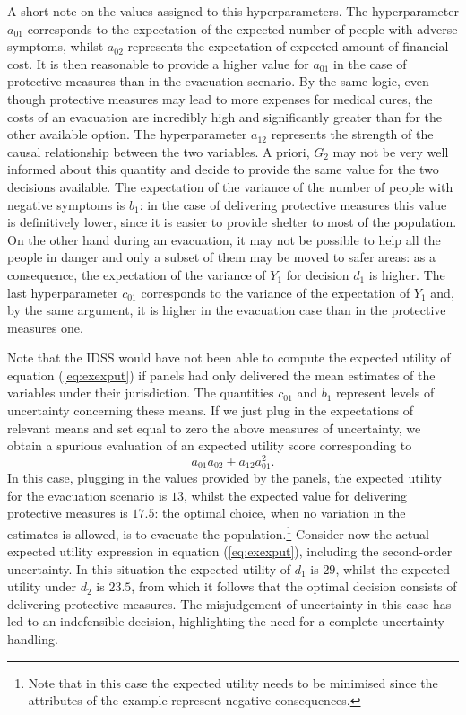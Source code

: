 A short note on the values assigned to this hyperparameters. The hyperparameter $a_{01}$ corresponds to the expectation of the expected number of people with adverse symptoms, whilst $a_{02}$ represents the expectation of expected amount of financial cost. It is then reasonable to provide a higher value for $a_{01}$ in the case of protective measures than in the evacuation scenario. By the same logic, even though protective measures may lead to more expenses for medical cures, the costs of an evacuation are incredibly high and significantly greater than for the other available option. The hyperparameter $a_{12}$ represents the strength of the causal relationship between the two variables. A priori, $G_2$ may not be very well informed about this quantity and decide to provide the same value for the two decisions available. The expectation of the variance of the number of people with negative symptoms is $b_1$: in the case of delivering protective measures this value is definitively lower, since it is easier to provide shelter to most of the population. On the other hand during an evacuation, it may not be possible to help all the people in danger and only a subset of them may be moved to safer areas: as a consequence, the expectation of the variance of $Y_1$ for decision $d_1$ is higher. The last hyperparameter $c_{01}$ corresponds to the variance of the expectation of $Y_1$ and, by the same argument, it is higher in the evacuation case than in the protective measures one.  

Note that the IDSS would have not been able to compute the expected utility of equation (\ref{eq:exexput}) if panels had only delivered the mean estimates of the variables under their jurisdiction. The quantities $c_{01}$ and $b_1$ represent levels of uncertainty concerning these means. If we just plug in the  expectations of relevant means and set equal to zero the above measures of uncertainty, we obtain a spurious evaluation of an expected utility score corresponding to 
\begin{equation*}
a_{01}a_{02}+a_{12}a_{01}^2.
\end{equation*}
In this case, plugging in the values provided by the panels, the expected utility for the evacuation scenario is $13$, whilst the expected value for delivering protective measures is $17.5$: the optimal choice, when no variation in the estimates is allowed, is to evacuate the population.\footnote{Note that in this case the expected utility needs to be minimised since the attributes of the example represent negative consequences.} Consider now the actual expected utility expression  in equation (\ref{eq:exexput}), including the second-order uncertainty. In this situation the expected utility of $d_1$ is $29$, whilst the expected utility under $d_2$ is $23.5$, from which it follows that the optimal decision consists of delivering protective measures. The misjudgement of uncertainty in this case has led to an indefensible decision, highlighting the need for a complete  uncertainty handling.

